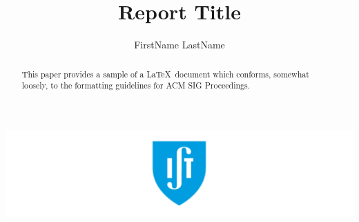 \documentclass[sigchi, review]{acmart}
\begin{document}
\title{Report Title}

\author{FirstName LastName}

\renewcommand{\shortauthors}{LastName et al.}


\begin{abstract}
This paper provides a sample of a \LaTeX\ document which conforms,
somewhat loosely, to the formatting guidelines for
ACM SIG Proceedings.
\end{abstract}

\begin{teaserfigure}
  \includegraphics[width=\textwidth]{teaser}
\end{teaserfigure}


\maketitle





\end{document}
